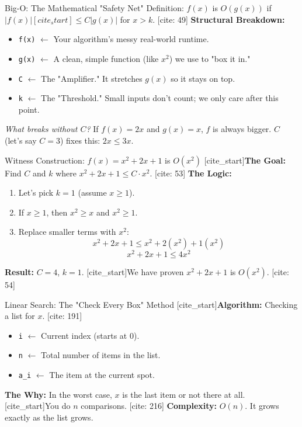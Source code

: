 \documentclass[landscape]{beamer}
\newcommand{\variable}[2]{\texttt{#1} \ensuremath{\leftarrow} #2}
\begin{document}
\begin{frame}{Big-O: The Mathematical "Safety Net"}
    Definition: $f(x)$ is $O(g(x))$ if $|f(x)| [cite_start]\le C |g(x)|$ for $x > k$. [cite: 49]
    \vspace{0.5em}
    \textbf{Structural Breakdown:}
    \begin{itemize}
        \item \variable{f(x)}{Your algorithm's messy real-world runtime.}
        \item \variable{g(x)}{A clean, simple function (like $x^2$) we use to "box it in."}
        \item \variable{C}{The "Amplifier." It stretches $g(x)$ so it stays on top.}
        \item \variable{k}{The "Threshold." Small inputs don't count; we only care after this point.}
    \end{itemize}
    \textit{What breaks without $C$?} If $f(x) = 2x$ and $g(x) = x$, $f$ is always bigger. $C$ (let's say $C=3$) fixes this: $2x \le 3x$.
\end{frame}

\begin{frame}{Witness Construction: $f(x) = x^2 + 2x + 1$ is $O(x^2)$}
    [cite_start]\textbf{The Goal:} Find $C$ and $k$ where $x^2 + 2x + 1 \le C \cdot x^2$. [cite: 53]
    \vspace{0.5em}
    \textbf{The Logic:}
    \begin{enumerate}
        \item Let's pick $k=1$ (assume $x \ge 1$).
        \item If $x \ge 1$, then $x^2 \ge x$ and $x^2 \ge 1$.
        \item Replace smaller terms with $x^2$:
        \[ x^2 + 2x + 1 \le x^2 + 2(x^2) + 1(x^2) \]
        \[ x^2 + 2x + 1 \le 4x^2 \]
    \end{enumerate}
    \textbf{Result:} $C = 4$, $k = 1$. [cite_start]We have proven $x^2 + 2x + 1$ is $O(x^2)$. [cite: 54]
\end{frame}

\begin{frame}{Linear Search: The "Check Every Box" Method}
    [cite_start]\textbf{Algorithm:} Checking a list for $x$. [cite: 191]
    \begin{itemize}
        \item \variable{i}{Current index (starts at 0).}
        \item \variable{n}{Total number of items in the list.}
        \item \variable{a_i}{The item at the current spot.}
    \end{itemize}
    \textbf{The Why:}
    In the worst case, $x$ is the last item or not there at all. [cite_start]You do $n$ comparisons. [cite: 216]
    \textbf{Complexity:} $O(n)$. It grows exactly as the list grows.
\end{frame}
\end{document}
